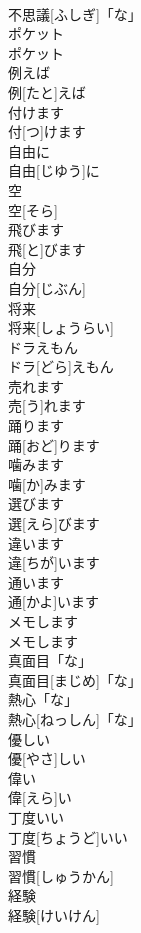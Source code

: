 \documentclass[8pt]{extreport}
\begin{document}
\begin{CJK}{UTF8}{min}
\\	不思議[ふしぎ]「な」	
\\	ポケット	
\\	ポケット	
\\	例えば	
\\	例[たと]えば	
\\	付けます	
\\	付[つ]けます	
\\	自由に	
\\	自由[じゆう]に	
\\	空	
\\	空[そら]	
\\	飛びます	
\\	飛[と]びます	
\\	自分	
\\	自分[じぶん]	
\\	将来	
\\	将来[しょうらい]	
\\	ドラえもん	
\\	ドラ[どら]えもん	
\\	売れます	
\\	売[う]れます	
\\	踊ります	
\\	踊[おど]ります	
\\	噛みます	
\\	噛[か]みます	
\\	選びます	
\\	選[えら]びます	
\\	違います	
\\	違[ちが]います	
\\	通います	
\\	通[かよ]います	
\\	メモします	
\\	メモします	
\\	真面目「な」	
\\	真面目[まじめ]「な」	
\\	熱心「な」	
\\	熱心[ねっしん]「な」	
\\	優しい	
\\	優[やさ]しい	
\\	偉い	
\\	偉[えら]い	
\\	丁度いい	
\\	丁度[ちょうど]いい	
\\	習慣	
\\	習慣[しゅうかん]	
\\	経験	
\\	経験[けいけん]	

\end{CJK}
\end{document}
